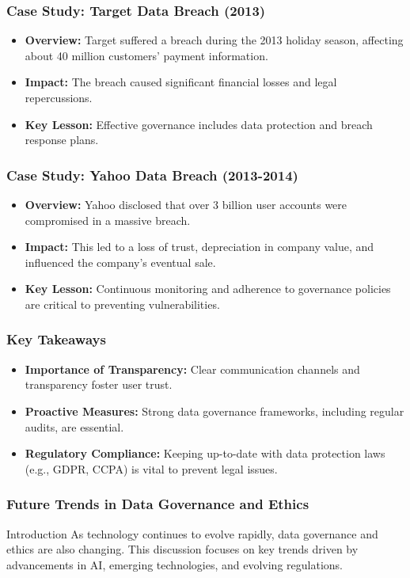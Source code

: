 \documentclass{beamer}
\begin{document}
\begin{frame}[fragile]
    \frametitle{Case Study: Target Data Breach (2013)}

    \begin{itemize}
        \item \textbf{Overview:} Target suffered a breach during the 2013 holiday season, affecting about 40 million customers' payment information.
        \item \textbf{Impact:} The breach caused significant financial losses and legal repercussions.
        \item \textbf{Key Lesson:} Effective governance includes data protection and breach response plans.
    \end{itemize}
\end{frame}

\begin{frame}[fragile]
    \frametitle{Case Study: Yahoo Data Breach (2013-2014)}

    \begin{itemize}
        \item \textbf{Overview:} Yahoo disclosed that over 3 billion user accounts were compromised in a massive breach.
        \item \textbf{Impact:} This led to a loss of trust, depreciation in company value, and influenced the company's eventual sale.
        \item \textbf{Key Lesson:} Continuous monitoring and adherence to governance policies are critical to preventing vulnerabilities.
    \end{itemize}
\end{frame}

\begin{frame}[fragile]
    \frametitle{Key Takeaways}

    \begin{itemize}
        \item \textbf{Importance of Transparency:} Clear communication channels and transparency foster user trust.
        \item \textbf{Proactive Measures:} Strong data governance frameworks, including regular audits, are essential.
        \item \textbf{Regulatory Compliance:} Keeping up-to-date with data protection laws (e.g., GDPR, CCPA) is vital to prevent legal issues.
    \end{itemize}
\end{frame}

\begin{frame}[fragile]
    \frametitle{Future Trends in Data Governance and Ethics}
    \begin{block}{Introduction}
        As technology continues to evolve rapidly, data governance and ethics are also changing. This discussion focuses on key trends driven by advancements in AI, emerging technologies, and evolving regulations.
    \end{block}
\end{frame}
\end{document}
